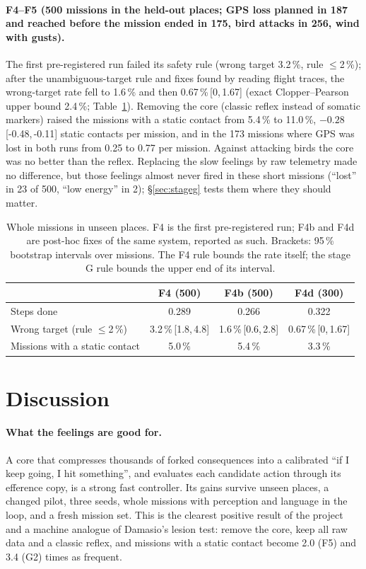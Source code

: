 \documentclass[10pt]{article}
\newcommand{\ci}[2]{\,[#1,\,#2]}
\begin{document}
\paragraph{F4--F5 (500 missions in the held-out places; GPS loss planned in 187 and reached before the mission ended in 175, bird attacks in 256, wind with gusts).}
The first pre-registered run failed its safety rule (wrong target 3.2\,\%, rule $\le$2\,\%); after the unambiguous-target rule and
fixes found by reading flight traces, the wrong-target rate fell to 1.6\,\% and then 0.67\,\%\ci{0}{1.67} (exact Clopper--Pearson upper bound 2.4\,\%; Table~\ref{tab:f4}).
Removing the core (classic reflex instead of somatic markers) raised the missions with a static contact from 5.4\,\% to 11.0\,\%,
$-0.28$\ci{-0.48}{-0.11} static contacts per mission, and in the 173 missions where GPS was lost in both runs from 0.25 to 0.77 per mission. Against attacking birds the
core was no better than the reflex. Replacing the slow feelings by raw telemetry made no difference, but those feelings almost never
fired in these short missions (``lost'' in 23 of 500, ``low energy'' in 2); \S\ref{sec:stageg} tests them where they should matter.

\begin{table}[t]
\centering\small
\caption{Whole missions in unseen places. F4 is the first pre-registered run; F4b and F4d are post-hoc fixes of the same system,
reported as such. Brackets: 95\,\% bootstrap intervals over missions. The F4 rule bounds the rate itself; the stage G rule
bounds the upper end of its interval.}
\label{tab:f4}
\begin{tabular}{@{}lccc@{}}
\toprule
 & F4 (500) & F4b (500) & F4d (300) \\
\midrule
Steps done & 0.289 & 0.266 & 0.322 \\
Wrong target (rule $\le$2\,\%) & 3.2\,\%\ci{1.8}{4.8} & 1.6\,\%\ci{0.6}{2.8} & 0.67\,\%\ci{0}{1.67} \\
Missions with a static contact & 5.0\,\% & 5.4\,\% & 3.3\,\% \\
\bottomrule
\end{tabular}
\end{table}



\section{Discussion}
\paragraph{What the feelings are good for.} A core that compresses thousands of forked consequences into a calibrated ``if I keep
going, I hit something'', and evaluates each candidate action through its efference copy, is a strong fast controller. Its gains
survive unseen places, a changed pilot, three seeds, whole missions with perception and language in the loop, and a fresh mission
set. This is the clearest positive result of the project and a machine analogue of Damasio's lesion test: remove the core, keep all
raw data and a classic reflex, and missions with a static contact become 2.0 (F5) and 3.4 (G2) times as frequent.
\end{document}
